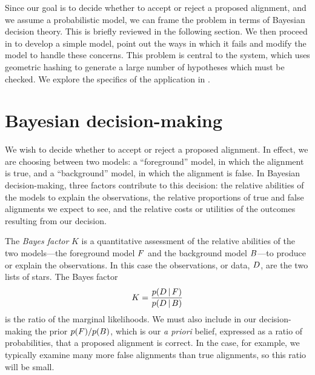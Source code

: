 


Since our goal is to decide whether to accept or reject a proposed
alignment, and we assume a probabilistic model, we can frame the
problem in terms of Bayesian decision theory.  This is briefly
reviewed in the following section.  We then proceed in
 to develop a simple model, point out the ways in
which it fails and modify the model to handle these concerns.  This
problem is central to the \an system, which uses geometric hashing to
generate a large number of hypotheses which must be checked.  We
explore the specifics of the \an application in
.


\section{Bayesian decision-making}


We wish to decide whether to accept or reject a proposed alignment.
In effect, we are choosing between two models: a ``foreground'' model,
in which the alignment is true, and a ``background'' model, in which
the alignment is false.  In Bayesian decision-making, three factors
contribute to this decision: the relative abilities of the models to
explain the observations, the relative proportions of true and false
alignments we expect to see, and the relative costs or utilities of
the outcomes resulting from our decision.


The \emph{Bayes factor} $K$ is a quantitative assessment of the
relative abilities of the two models---the foreground model $F$ and
the background model $B$---to produce or explain the observations.  In
this case the observations, or data, $D$, are the two lists of stars.
The Bayes factor
\begin{equation}
K = \frac{p(D \,\vert\, F)}{p(D \,\vert\, B)}
\label{eq:bayesf}
\end{equation}
is the ratio of the marginal likelihoods.  We must also include in our
decision-making the prior $p(F)/p(B)$, which is our \emph{a priori}
belief, expressed as a ratio of probabilities, that a proposed
alignment is correct.  In the \an case, for example, we typically
examine many more false alignments than true alignments, so this ratio
will be small.

